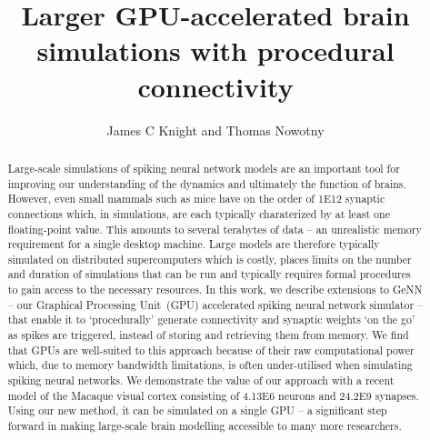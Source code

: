 \documentclass[9pt,a4paper]{amsart}
\title{Larger GPU-accelerated brain simulations with procedural connectivity}
\author{James C Knight and Thomas Nowotny}
\begin{document}
\begin{abstract}
Large-scale simulations of spiking neural network models are an important tool for improving our understanding of the dynamics and ultimately the function of brains.
However, even small mammals such as mice have on the order of \num{1E12} synaptic connections which, in simulations, are each typically charaterized by at least one floating-point value.
This amounts to several terabytes of data -- an unrealistic memory requirement for a single desktop machine.
Large models are therefore typically simulated on distributed supercomputers which is costly, places limits on the number and duration of simulations that can be run and typically requires formal procedures to gain access to the necessary resources.
In this work, we describe extensions to GeNN -- our Graphical Processing Unit~(GPU) accelerated spiking neural network simulator -- that enable it to `procedurally' generate connectivity and synaptic weights `on the go' as spikes are triggered, instead of storing and retrieving them from memory.
We find that GPUs are well-suited to this approach because of their raw computational power which, due to memory bandwidth limitations, is often under-utilised when simulating spiking neural networks.
We demonstrate the value of our approach with a recent model of the Macaque visual cortex consisting of \num{4.13E6} neurons and \num{24.2E9} synapses.
Using our new method, it can be simulated on a single GPU -- a significant step forward in making large-scale brain modelling accessible to many more researchers.
\end{abstract}
\maketitle
\end{document}
